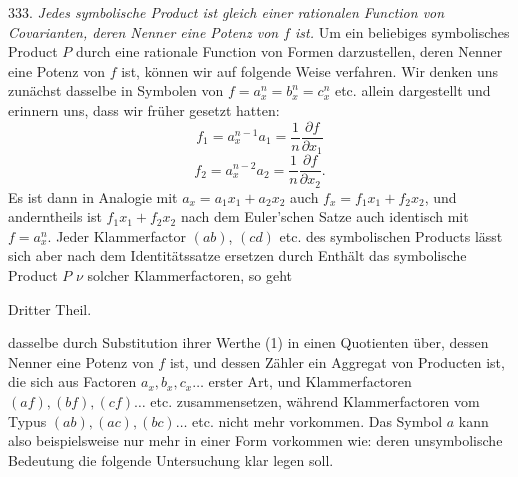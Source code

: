333. \textit{Jedes symbolische Product ist gleich einer rationalen Function von Covarianten, deren Nenner eine Potenz von $f$ ist.} Um ein beliebiges symbolisches Product $P$ durch eine rationale Function von Formen darzustellen, deren Nenner eine Potenz von $f$ ist, können wir auf folgende Weise verfahren. Wir denken uns zunächst dasselbe in Symbolen von $f = a_x^n = b_x^n = c_x^n$ etc. allein dargestellt und erinnern uns, dass wir früher gesetzt hatten:
\[
f_1 = a_x^{n-1}a_1 = \frac{1}{n}\frac{\partial f}{\partial x_1}
\]
\[
f_2 = a_x^{n-2}a_2 = \frac{1}{n}\frac{\partial f}{\partial x_2}.
\]
Es ist dann in Analogie mit $a_x = a_1x_1 + a_2x_2$ auch $f_x = f_1x_1 + f_2x_2$, und anderntheils ist $f_1x_1 + f_2x_2$ nach dem Euler'schen Satze auch identisch mit $f = a_x^n$. Jeder Klammerfactor $(ab)$, $(cd)$ etc. des symbolischen Products lässt sich aber nach dem Identitätssatze ersetzen durch
Enthält das symbolische Product $P$ $\nu$ solcher Klammerfactoren, so geht


Dritter Theil.

dasselbe durch Substitution ihrer Werthe (1) in einen Quotienten über, dessen Nenner eine Potenz von $f$ ist, und dessen Zähler ein Aggregat von Producten ist, die sich aus Factoren $a_x, b_x, c_x \ldots$ erster Art, und Klammerfactoren $(af), (bf), (cf) \ldots$ etc. zusammensetzen, während Klammerfactoren vom Typus $(ab), (ac), (bc) \ldots$ etc. nicht mehr vorkommen. Das Symbol $a$ kann also beispielsweise nur mehr in einer Form vorkommen wie:
deren unsymbolische Bedeutung die folgende Untersuchung klar legen soll.

